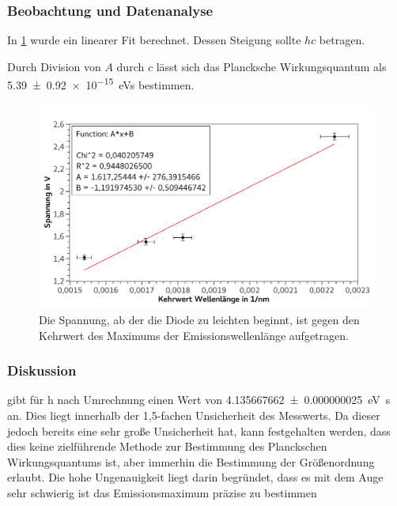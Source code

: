 \documentclass[
	a4paper,
	12pt,
	pagesize,
	ngerman
]{scrartcl}
\begin{document}
	\subsubsection{Beobachtung und Datenanalyse}
	In \cref{fig_led} wurde ein linearer Fit berechnet. 
	Dessen Steigung sollte $hc$ betragen.

	Durch Division von $A$ durch $c$ lässt sich das Plancksche Wirkungsquantum als \SI{5,39 +- 0,92 e-15}{eVs} bestimmen.

	\begin{figure}[H] %
		\includegraphics[width=1\textwidth]{fig_led} 
		\centering
		\caption{Die Spannung, ab der die Diode zu leichten beginnt, ist gegen den Kehrwert des Maximums der Emissionswellenlänge aufgetragen.}
		\label{fig_led}
		\centering
	\end{figure}	

	
	\subsubsection{Diskussion}
	
	\cite{Planck} gibt für h nach Umrechnung einen Wert von \SI{4.135667662 \pm 0.000000025}{\electronvolt \second} an.
	Dies liegt innerhalb der 1,5-fachen Unsicherheit des Messwerts.
	Da dieser jedoch bereits eine sehr große Unsicherheit hat, kann festgehalten werden, dass dies keine zielführende Methode zur Bestimmung des Planckschen Wirkungsquantums ist, aber immerhin die Bestimmung der Größenordnung erlaubt.
	Die hohe Ungenauigkeit liegt darin begründet, dass es mit dem Auge sehr schwierig ist das Emissionsmaximum präzise zu bestimmen
	
\end{document}
